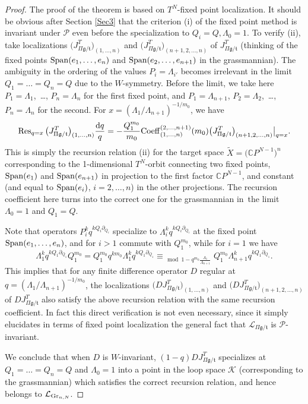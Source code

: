 \documentclass[pdftex]{sigma}
\numberwithin{equation}{section}
\def\K{\mathcal K}
\def\L{\mathcal L}
\def\CC{\mathbb C}
\def\Res{\operatorname{Res}}
\def\tilde{\widetilde}
\def\p{\partial}
\begin{document}
\begin{proof}
The proof of the theorem is based on $T^N$-fixed point localization. It should be obvious after Section \ref{Sec3} that the criterion (i) of the fixed point method is invariant under ${\mathcal P}$ even before the specialization to $Q_i=Q, \Lambda_0=1$. To verify (ii), take localizations $\big(J^T_{\Pi \mathfrak{g}/\mathfrak{t}}\big)_{(1,\dots,n)}$ and $\big(J^T_{\Pi \mathfrak{g}/\mathfrak{t}}\big)_{(n+1, 2,\dots,n)}$ of $J^T_{\Pi \mathfrak{g}/\mathfrak{t}}$ (thinking of the fixed points $\mathop{\rm Span}(e_1,\dots,e_n)$ and $\mathop{\rm Span}(e_2,\dots,e_{n+1})$ in the grassmannian). The ambiguity in the ordering of the values $P_i=\Lambda_{i'}$ becomes irrelevant in the limit $Q_1=\dots=Q_n=Q$ due to the $W$-symmetry. Before the limit, we take here $P_1=\Lambda_1$,~\dots, $P_n=\Lambda_n$ for the first fixed point, and $P_1=\Lambda_{n+1}$, $P_2=\Lambda_2$,~\dots, $P_n=\Lambda_n$ for the second. For $x=(\Lambda_1/\Lambda_{n+1})^{-1/m_0}$, we have
\[
\Res_{q=x} \big(J^T_{\Pi \mathfrak{g}/\mathfrak{t}}\big)_{(1,\dots,n)}\frac{{\rm d}q}{q} = -\frac{Q_1^{m_0}}{m_0} {\rm Coeff}_{(1,\dots,n)}^{(2,\dots,n+1)}(m_0)\big(J^T_{\Pi \mathfrak{g}/\mathfrak{t}}\big)_{(n+1, 2,\dots,n)}\big|_{q=x}.
\]
This is simply the recursion relation (ii) for the target space $\tilde{X}=\big(\CC P^{N-1}\big)^n$ corresponding to the 1-dimensional $T^N$-orbit connecting two fixed points, $\mathop{\rm Span}(e_1)$ and $\mathop{\rm Span}(e_{n+1})$ in projection to the first factor $\CC P^{N-1}$, and constant (and equal to $\mathop{\rm Span}(e_i)$, $i=2,\dots,n$) in the other projections. The recursion coefficient here turns into the correct one for the grassmannian in~the limit $\Lambda_0=1$ and $Q_1=Q$.

Note that operators $P_i^kq^{kQ_i\p_{Q_i}}$ specialize to $\Lambda_i^k q^{kQ_i\p_{Q_i}}$ at the fixed point $\mathop{\rm Span}(e_1,\dots,e_n)$, and for $i>1$ commute with $Q_1^{m_0}$, while for $i=1$ we have
\[
\Lambda_1^k q^{kQ_1\p_{Q_1}} Q_1^{m_0}=Q_1^{m_0}q^{km_0} \Lambda_1^k q^{kQ_1\p_{Q_1}} \equiv_{\mod 1-q^{m_0}\frac{\Lambda_1}{\Lambda_{n+1}}}
Q_1^{m_0}\Lambda_{n+1}^{k} q^{kQ_1\p_{Q_1}}.
\]
This implies that for any finite difference operator $D$ regular at $q=(\Lambda_1/\Lambda_{n+1})^{-1/m_0}$, the localizations $\big(D J^T_{\Pi \mathfrak{g}/\mathfrak{t}}\big)_{(1,\dots,n)}$ and $\big(D J^T_{\Pi \mathfrak{g}/\mathfrak{t}}\big)_{(n+1,2,\dots,n)}$ of $D J^T_{\Pi \mathfrak{g}/\mathfrak{t}}$ also satisfy the above recursion relation with the same recursion coefficient. In fact this direct verification is not even necessary, since it simply elucidates in terms of fixed point localization the general fact that $\L_{\Pi \mathfrak{g}/\mathfrak{t}}$ is ${\mathcal P}$-invariant.

We conclude that when $D$ is $W$-invariant, $(1-q) D J^T_{\Pi \mathfrak{g}/\mathfrak{t}}$ specializes at $Q_1=\dots=Q_n=Q$ and $\Lambda_0=1$ into a point in the loop space $\K$ (corresponding to the grassmannian) which satisfies the correct recursion relation, and hence belongs to $\L_{{\rm Gr}_{n,N}}$.
\end{proof}
\end{document}
